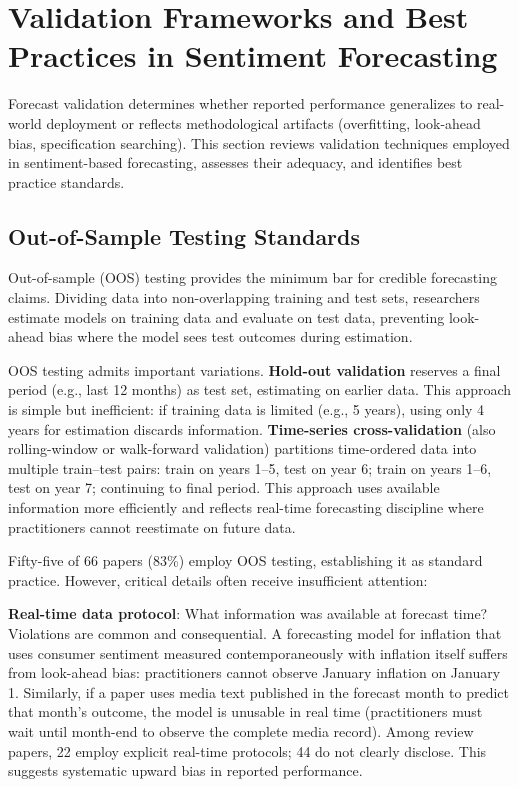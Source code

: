 
\section{Validation Frameworks and Best Practices in Sentiment Forecasting}

Forecast validation determines whether reported performance generalizes to real-world deployment or reflects methodological artifacts (overfitting, look-ahead bias, specification searching). This section reviews validation techniques employed in sentiment-based forecasting, assesses their adequacy, and identifies best practice standards.

\subsection{Out-of-Sample Testing Standards}

Out-of-sample (OOS) testing provides the minimum bar for credible forecasting claims. Dividing data into non-overlapping training and test sets, researchers estimate models on training data and evaluate on test data, preventing look-ahead bias where the model sees test outcomes during estimation.

OOS testing admits important variations. \textbf{Hold-out validation} reserves a final period (e.g., last 12 months) as test set, estimating on earlier data. This approach is simple but inefficient: if training data is limited (e.g., 5 years), using only 4 years for estimation discards information. \textbf{Time-series cross-validation} (also rolling-window or walk-forward validation) partitions time-ordered data into multiple train--test pairs: train on years 1--5, test on year 6; train on years 1--6, test on year 7; continuing to final period. This approach uses available information more efficiently and reflects real-time forecasting discipline where practitioners cannot reestimate on future data.

Fifty-five of 66 papers (83\%) employ OOS testing, establishing it as standard practice. However, critical details often receive insufficient attention:

\textbf{Real-time data protocol}: What information was available at forecast time? Violations are common and consequential. A forecasting model for inflation that uses consumer sentiment measured contemporaneously with inflation itself suffers from look-ahead bias: practitioners cannot observe January inflation on January 1. Similarly, if a paper uses media text published in the forecast month to predict that month's outcome, the model is unusable in real time (practitioners must wait until month-end to observe the complete media record). Among review papers, 22 employ explicit real-time protocols; 44 do not clearly disclose. This suggests systematic upward bias in reported performance.

